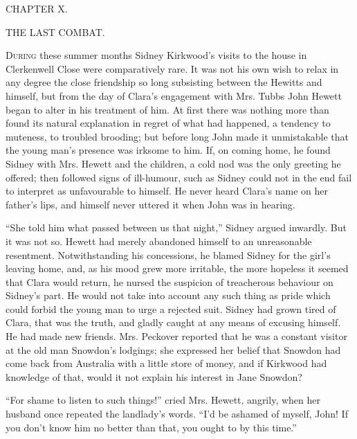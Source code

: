 {}

{CHAPTER X.}

THE LAST COMBAT.

\textsc{During} these summer months Sidney Kirkwood's visits to the
house in Clerkenwell Close were comparatively rare. It was not his own
wish to relax in any degree the close friendship so long subsisting
between the Hewitts and himself, but from the day of Clara's engagement
with Mrs. Tubbs John Hewett began to alter in his treatment of him. At
first there was nothing more than found its natural explanation in
regret of what had happened, a tendency to muteness, to troubled
brooding; but before long John made it unmistakable that the young man's
presence was irksome to him. If, on coming home, he found Sidney with
Mrs. Hewett and the children, a cold nod was the only greeting he
offered; then followed signs of ill-humour, {}such as Sidney could not
in the end fail to interpret as unfavourable to himself. He never heard
Clara's name on her father's lips, and himself never uttered it when
John was in hearing.

``She told him what passed between us that night,'' Sidney argued
inwardly. But it was not so. Hewett had merely abandoned himself to an
unreasonable resentment. Notwithstanding his concessions, he blamed
Sidney for the girl's leaving home, and, as his mood grew more
irritable, the more hopeless it seemed that Clara would return, he
nursed the suspicion of treacherous behaviour on Sidney's part. He would
not take into account any such thing as pride which could forbid the
young man to urge a rejected suit. Sidney had grown tired of Clara, that
was the truth, and gladly caught at any means of excusing himself. He
had made new friends. Mrs. Peckover reported that he was a constant
visitor at the old man Snowdon's lodgings; she expressed her belief that
Snowdon had come back from Australia with a little store {}of money, and
if Kirkwood had knowledge of that, would it not explain his interest in
Jane Snowdon?

``For shame to listen to such things!'' cried Mrs. Hewett, angrily, when
her husband once repeated the landlady's words. ``I'd be ashamed of
myself, John! If you don't know him no better than that, you ought to by
this time.''

